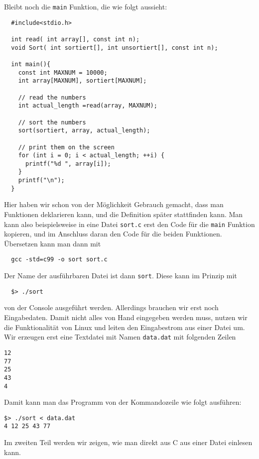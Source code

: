 Bleibt noch die \verb|main| Funktion, die wie folgt aussieht:
\begin{lstlisting}
  #include<stdio.h>
  
  int read( int array[], const int n);  
  void Sort( int sortiert[], int unsortiert[], const int n);

  int main(){
    const int MAXNUM = 10000;
    int array[MAXNUM], sortiert[MAXNUM];

    // read the numbers
    int actual_length =read(array, MAXNUM);

    // sort the numbers
    sort(sortiert, array, actual_length);

    // print them on the screen
    for (int i = 0; i < actual_length; ++i) {
      printf("%d ", array[i]); 
    }
    printf("\n");
  }
\end{lstlisting}
Hier haben wir schon von der Möglichkeit Gebrauch gemacht, dass man Funktionen deklarieren kann, und die Definition später stattfinden kann.
Man kann also beispielsweise in eine Datei \verb|sort.c| erst den Code für die \verb|main| Funktion kopieren, und im Anschluss daran den Code für die beiden Funktionen.
Übersetzen kann man dann mit
\begin{verbatim}
  gcc -std=c99 -o sort sort.c
\end{verbatim}
Der Name der ausführbaren Datei ist dann \verb|sort|.
Diese kann im Prinzip mit 
\begin{verbatim}                                                                                                    
  $> ./sort
\end{verbatim}
von der Console ausgeführt werden.
Allerdings brauchen wir erst noch Eingabedaten.
Damit nicht alles von Hand eingegeben werden muss, nutzen wir die Funktionalität von Linux und leiten den Eingabestrom aus einer Datei um.
Wir erzeugen erst eine Textdatei mit Namen \verb|data.dat| mit folgenden Zeilen
\begin{lstlisting}
12
77
25
43
4
\end{lstlisting}
Damit kann man das Programm von der Kommandozeile wie folgt ausführen:
\begin{verbatim}
$> ./sort < data.dat
4 12 25 43 77
\end{verbatim}
Im zweiten Teil werden wir zeigen, wie man direkt aus C aus einer Datei einlesen kann.

\endinput
